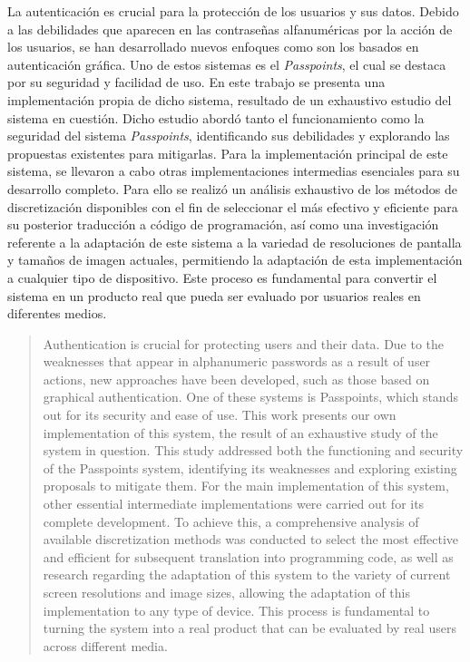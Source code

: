 \begin{resumen}
	La autenticación es crucial para la protección de los usuarios y sus datos. Debido a las debilidades que aparecen en las contraseñas alfanuméricas por la acción de los usuarios, se han desarrollado nuevos enfoques como son los basados en autenticación gráfica. Uno de estos sistemas es el \textit{Passpoints}, el cual se destaca por su seguridad y facilidad de uso. En este trabajo se presenta una implementación propia de dicho sistema, resultado de un exhaustivo estudio del sistema en cuestión. Dicho estudio abordó tanto el funcionamiento como la seguridad del sistema \textit{Passpoints}, identificando sus debilidades y explorando las propuestas existentes para mitigarlas. Para la implementación principal de este sistema, se llevaron a cabo otras implementaciones intermedias esenciales para su desarrollo completo. Para ello se realizó un análisis exhaustivo de los métodos de discretización disponibles con el fin de seleccionar el más efectivo y eficiente para su posterior traducción a código de programación, así como una investigación referente a la adaptación de este sistema a la variedad de resoluciones de pantalla y tamaños de imagen actuales, permitiendo la adaptación de esta implementación a cualquier tipo de dispositivo. Este proceso es fundamental para convertir el sistema en un producto real que pueda ser evaluado por usuarios reales en diferentes medios.
\end{resumen}

\begin{abstract}
  Authentication is crucial for protecting users and their data. Due to the weaknesses that appear in alphanumeric passwords as a result of user actions, new approaches have been developed, such as those based on graphical authentication. One of these systems is Passpoints, which stands out for its security and ease of use. This work presents our own implementation of this system, the result of an exhaustive study of the system in question. This study addressed both the functioning and security of the Passpoints system, identifying its weaknesses and exploring existing proposals to mitigate them. For the main implementation of this system, other essential intermediate implementations were carried out for its complete development. To achieve this, a comprehensive analysis of available discretization methods was conducted to select the most effective and efficient for subsequent translation into programming code, as well as research regarding the adaptation of this system to the variety of current screen resolutions and image sizes, allowing the adaptation of this implementation to any type of device. This process is fundamental to turning the system into a real product that can be evaluated by real users across different media.
\end{abstract}